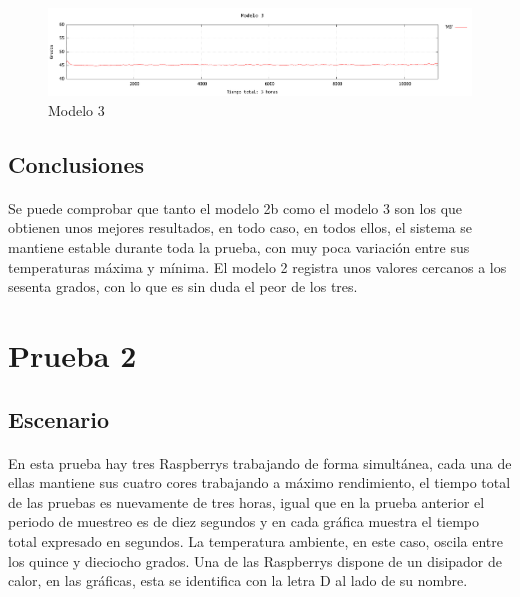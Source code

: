 \begin{figure}[H]
	\centering
  	\includegraphics[width=160mm]{Test/Pr1_modelo3.pdf}
   	\caption[Prueba 1, Modelo 3]{Modelo 3}
   \label{figure5.4}
\end{figure}

\subsection{Conclusiones}
\paragraph{}

Se puede comprobar que tanto el modelo 2b como el modelo 3 son los que obtienen unos mejores resultados, en todo caso, en todos ellos, el sistema se mantiene estable durante toda la prueba, con muy poca variación entre sus temperaturas máxima y mínima. El modelo 2 registra unos valores cercanos a los sesenta grados, con lo que es sin duda el peor de los tres.

\section{Prueba 2}
\label{makereference5.4}
\subsection{Escenario}
\paragraph{}

En esta prueba hay tres Raspberrys trabajando de forma simultánea, cada una de ellas mantiene sus cuatro cores trabajando a máximo rendimiento, el tiempo total de las pruebas es nuevamente de tres horas, igual que en la prueba anterior el periodo de muestreo es de diez segundos y en cada gráfica muestra el tiempo total expresado en segundos. La temperatura ambiente, en este caso, oscila entre los quince y dieciocho grados. Una de las Raspberrys dispone de un disipador de calor, en las gráficas, esta se identifica con la letra D al lado de su nombre.

